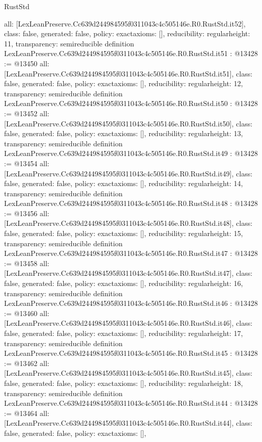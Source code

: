 \begin{lexlean}{RustStd}
\begin{coremodule}
{  all: [LexLeanPreserve.Cc639d244984595f0311043c4c505146e.R0.RustStd.it52],
  class: false,
  generated: false,
  policy: exact{axioms: []},
  reducibility: regular{height: 11},
  transparency: semireducible
}
definition LexLeanPreserve.Cc639d244984595f0311043c4c505146e.R0.RustStd.it51 : @13428 := @13450 {
  all: [LexLeanPreserve.Cc639d244984595f0311043c4c505146e.R0.RustStd.it51],
  class: false,
  generated: false,
  policy: exact{axioms: []},
  reducibility: regular{height: 12},
  transparency: semireducible
}
definition LexLeanPreserve.Cc639d244984595f0311043c4c505146e.R0.RustStd.it50 : @13428 := @13452 {
  all: [LexLeanPreserve.Cc639d244984595f0311043c4c505146e.R0.RustStd.it50],
  class: false,
  generated: false,
  policy: exact{axioms: []},
  reducibility: regular{height: 13},
  transparency: semireducible
}
definition LexLeanPreserve.Cc639d244984595f0311043c4c505146e.R0.RustStd.it49 : @13428 := @13454 {
  all: [LexLeanPreserve.Cc639d244984595f0311043c4c505146e.R0.RustStd.it49],
  class: false,
  generated: false,
  policy: exact{axioms: []},
  reducibility: regular{height: 14},
  transparency: semireducible
}
definition LexLeanPreserve.Cc639d244984595f0311043c4c505146e.R0.RustStd.it48 : @13428 := @13456 {
  all: [LexLeanPreserve.Cc639d244984595f0311043c4c505146e.R0.RustStd.it48],
  class: false,
  generated: false,
  policy: exact{axioms: []},
  reducibility: regular{height: 15},
  transparency: semireducible
}
definition LexLeanPreserve.Cc639d244984595f0311043c4c505146e.R0.RustStd.it47 : @13428 := @13458 {
  all: [LexLeanPreserve.Cc639d244984595f0311043c4c505146e.R0.RustStd.it47],
  class: false,
  generated: false,
  policy: exact{axioms: []},
  reducibility: regular{height: 16},
  transparency: semireducible
}
definition LexLeanPreserve.Cc639d244984595f0311043c4c505146e.R0.RustStd.it46 : @13428 := @13460 {
  all: [LexLeanPreserve.Cc639d244984595f0311043c4c505146e.R0.RustStd.it46],
  class: false,
  generated: false,
  policy: exact{axioms: []},
  reducibility: regular{height: 17},
  transparency: semireducible
}
definition LexLeanPreserve.Cc639d244984595f0311043c4c505146e.R0.RustStd.it45 : @13428 := @13462 {
  all: [LexLeanPreserve.Cc639d244984595f0311043c4c505146e.R0.RustStd.it45],
  class: false,
  generated: false,
  policy: exact{axioms: []},
  reducibility: regular{height: 18},
  transparency: semireducible
}
definition LexLeanPreserve.Cc639d244984595f0311043c4c505146e.R0.RustStd.it44 : @13428 := @13464 {
  all: [LexLeanPreserve.Cc639d244984595f0311043c4c505146e.R0.RustStd.it44],
  class: false,
  generated: false,
  policy: exact{axioms: []},
}
\end{coremodule}
\end{lexlean}
